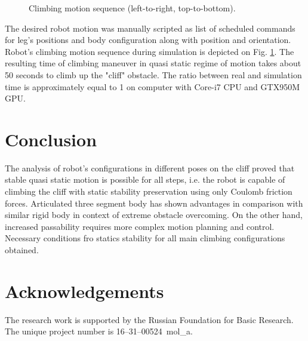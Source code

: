 \documentclass{ws-procs9x6}
\begin{document}
\begin{figure}
  \centering
  \\
  \\
  \\
  \\
  \\
  \caption{Climbing motion sequence (left-to-right, top-to-bottom).
    \label{kinogramm}}
\end{figure}

The desired robot motion was manually scripted as list of scheduled commands for leg's positions and body configuration along with position and orientation. Robot's climbing motion sequence during simulation is depicted on Fig. \ref{kinogramm}. The resulting time of climbing maneuver in quasi static regime of motion takes about 50 seconds to climb up the "cliff" obstacle. The ratio between real and simulation time is approximately equal to 1 on computer with Core-i7 CPU and GTX950M GPU.


\section{Conclusion}
The analysis of robot's configurations in different poses on the cliff proved that stable quasi static motion is possible for all steps, i.e. the robot is capable of climbing the cliff with static stability preservation using only Coulomb friction forces. Articulated three segment body has shown advantages in comparison with similar rigid body in context of extreme obstacle overcoming. On the other hand, increased passability requires more complex motion planning and control.
Necessary conditions fro statics stability for all main climbing configurations obtained.


\section*{Acknowledgements}
The research work is supported by the Russian Foundation for Basic Research. The unique project number is 16--31--00524~mol\_a.
\end{document}
